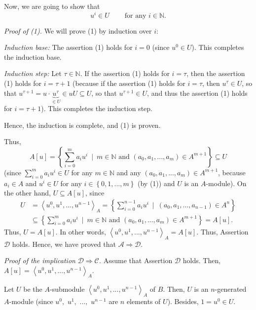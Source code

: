 \documentclass[12pt,final,notitlepage,onecolumn]{article}%
\begin{document}
Now, we are going to show that
\begin{equation}
u^{i}\in U\ \ \ \ \ \ \ \ \ \ \text{for any }i\in\mathbb{N}. \label{1}%
\end{equation}


\textit{Proof of (1).} We will prove (1) by induction over $i$:

\textit{Induction base:} The assertion (1) holds for $i=0$ (since $u^{0}\in
U$). This completes the induction base.

\textit{Induction step:} Let $\tau\in\mathbb{N}$. If the assertion (1) holds
for $i=\tau$, then the assertion (1) holds for $i=\tau+1$ (because if the
assertion (1) holds for $i=\tau$, then $u^{\tau}\in U$, so that $u^{\tau
+1}=u\cdot\underbrace{u^{\tau}}_{\in U}\in uU\subseteq U$, so that $u^{\tau
+1}\in U$, and thus the assertion (1) holds for $i=\tau+1$). This completes
the induction step.

Hence, the induction is complete, and (1) is proven.

Thus,%
\[
A\left[  u\right]  =\left\{  \sum\limits_{i=0}^{m}a_{i}u^{i}\ \mid
\ m\in\mathbb{N}\text{ and }\left(  a_{0},a_{1},...,a_{m}\right)  \in
A^{m+1}\right\}  \subseteq U
\]
(since $\sum\limits_{i=0}^{m}a_{i}u^{i}\in U$ for any $m\in\mathbb{N}$ and any
$\left(  a_{0},a_{1},...,a_{m}\right)  \in A^{m+1}$, because $a_{i}\in A$ and
$u^{i}\in U$ for any $i\in\left\{  0,1,...,m\right\}  $ (by (1)) and $U$ is an
$A$-module). On the other hand, $U\subseteq A\left[  u\right]  $, since%
\begin{align*}
U  &  =\left\langle u^{0},u^{1},...,u^{n-1}\right\rangle _{A}=\left\{
\sum\limits_{i=0}^{n-1}a_{i}u^{i}\ \mid\ \left(  a_{0},a_{1},...,a_{n-1}%
\right)  \in A^{n}\right\} \\
&  \subseteq\left\{  \sum\limits_{i=0}^{m}a_{i}u^{i}\ \mid\ m\in
\mathbb{N}\text{ and }\left(  a_{0},a_{1},...,a_{m}\right)  \in A^{m+1}%
\right\}  =A\left[  u\right]  .
\end{align*}
Thus, $U=A\left[  u\right]  $. In other words, $\left\langle u^{0}%
,u^{1},...,u^{n-1}\right\rangle _{A}=A\left[  u\right]  $. Thus, Assertion
$\mathcal{D}$ holds. Hence, we have proved that $\mathcal{A}\Longrightarrow
\mathcal{D}$.

\textit{Proof of the implication }$\mathcal{D}\Longrightarrow\mathcal{C}%
$\textit{.} Assume that Assertion $\mathcal{D}$ holds. Then, $A\left[
u\right]  =\left\langle u^{0},u^{1},...,u^{n-1}\right\rangle _{A}$.

Let $U$ be the $A$-submodule $\left\langle u^{0},u^{1},...,u^{n-1}%
\right\rangle _{A}$ of $B$. Then, $U$ is an $n$-generated $A$-module (since
$u^{0},$ $u^{1},$ $...,$ $u^{n-1}$ are $n$ elements of $U$). Besides,
$1=u^{0}\in U$.
\end{document}
